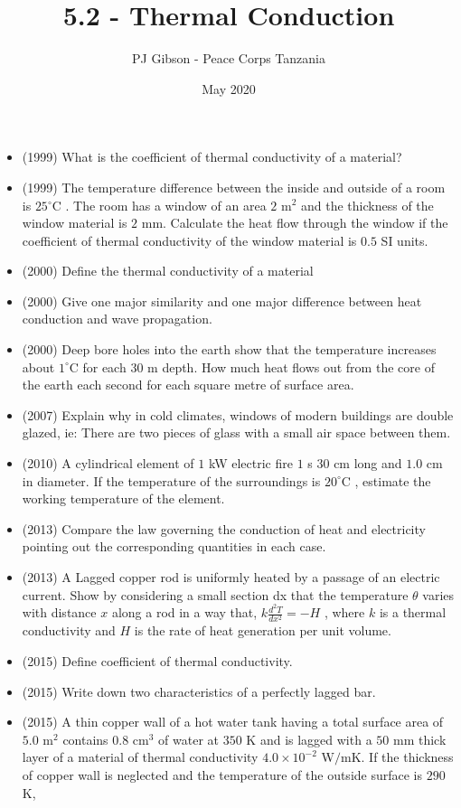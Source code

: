 \documentclass{article}
\title{\textbf{5.2 - Thermal Conduction}}
\author{PJ Gibson - Peace Corps Tanzania}
\date{May 2020}
\begin{document}
\maketitle

\begin{itemize}
\item (1999)  What is the coefficient of thermal conductivity of a material?
\item (1999)  The temperature difference between the inside and outside of a room is $ 25​^{\circ}$C . The room has a window of an area $ 2$ m$ ​^{2}$ and the thickness of the window material is $ 2$ mm. Calculate the heat flow through the window if the coefficient of thermal conductivity of the window material is $ 0.5$ SI units.
\item (2000)  Define the thermal conductivity of a material
\item (2000)  Give one major similarity and one major difference between heat conduction and wave propagation.
\item (2000)  Deep bore holes into the earth show that the temperature increases about $ 1^{\circ}$C for each $ 30$ m depth. How much heat flows out from the core of the earth each second for each square metre of surface area.
\item (2007)  Explain why in cold climates, windows of modern buildings are double glazed, ie: There are two pieces of glass with a small air space between them.
\item (2010)  A cylindrical element of $ 1$ kW electric fire $ 1$ s $ 30$ cm long and $ 1.0$ cm in  diameter. If the temperature of the surroundings is $ 20^{\circ}$C , estimate the working temperature of the element.
\item (2013)  Compare the law governing the conduction of heat and electricity pointing out the corresponding quantities in each case.
\item (2013)  A Lagged copper rod is uniformly heated by a passage of an electric current. Show by considering a small section dx that the temperature $ \theta $ varies with distance $ x$ along a rod in a way that, $ k\frac{d^{2}T}{dx^{2}}=-H$ , where $ k$ is a thermal conductivity and $ H$ is the rate of heat generation per unit volume.
\item (2015)  Define coefficient of thermal conductivity.
\item (2015)  Write down two characteristics of a perfectly lagged bar.
\item (2015)  A thin copper wall of a hot water tank having a total surface area of $ 5.0$ m$ ^{2}$ contains $ 0.8$ cm$ ^{3}$ of water at $ 350$ K and is lagged with a $ 50$ mm thick layer of a material of thermal conductivity $ 4.0\times10^{-2}$ W$/$mK. If the thickness of copper wall is neglected and the temperature of the outside surface is $ 290$ K,

\end{itemize}
\end{document}
